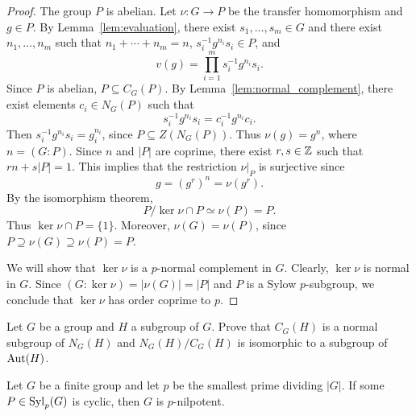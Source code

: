 \begin{proof}
	The group $P$ is abelian. Let $\nu\colon G\to P$ be the transfer homomorphism and $g\in P$. By Lemma~\ref{lem:evaluation}, there exist $s_1,\dots,s_m\in G$ and there exist $n_1,\dots,n_m$ such that $n_1+\cdots+n_m=n$, $s_i^{-1}g^{n_i}s_i\in P$, and 
	\[
		v(g)=\prod_{i=1}^m s_i^{-1}g^{n_i}s_i.
	\]
	Since $P$ is abelian, $P\subseteq C_G(P)$. By Lemma~\ref{lem:normal_complement}, 
    there exist elements $c_i\in N_G(P)$ such that 
	\[
	s_i^{-1}g^{n_i}s_i=c_i^{-1}g^{n_i}c_i.
	\]
	Then $s_i^{-1}g^{n_i}s_i=g_i^{n_i}$, since $P\subseteq Z(N_G(P))$. Thus $\nu(g)=g^n$, where $n=(G:P)$. Since $n$ and $|P|$ are coprime, there exist $r,s\in\mathbb{Z}$ such that $rn+s|P|=1$. This implies that the 
    restriction $\nu|_P$ is surjective since 
	\[
	g=(g^r)^n=\nu(g^r).
	\]
	By the isomorphism theorem, 
    \[
    P/\ker\nu\cap P\simeq\nu(P)=P.
    \]
    Thus $\ker\nu\cap P=\{1\}$. Moreover, $\nu(G)=\nu(P)$, since $P\supseteq \nu(G)\supseteq \nu(P)=P$.
	
	We will show that $\ker\nu$ is a $p$-normal complement in $G$. Clearly, $\ker\nu$ is normal in $G$. Since $(G:\ker\nu)=|\nu(G)|=|P|$ and $P$ is a Sylow $p$-subgroup, we conclude that $\ker\nu$ has order coprime to $p$.
\end{proof}

\begin{exercise}
	\label{xca:NC}
	Let $G$ be a group and $H$ a subgroup of $G$. Prove that
    $C_G(H)$ is a normal subgroup of $N_G(H)$ and $N_G(H)/C_G(H)$ is isomorphic to a subgroup of $\operatorname{Aut}(H)$.
\end{exercise}


\begin{exercise}
	\label{corollary:Sylow_cyclic}
	Let $G$ be a finite group and let $p$ be the smallest prime dividing $|G|$. If some $P\in\mathrm{Syl}_p(G)$ is cyclic, then $G$ is $p$-nilpotent.
\end{exercise}

	
